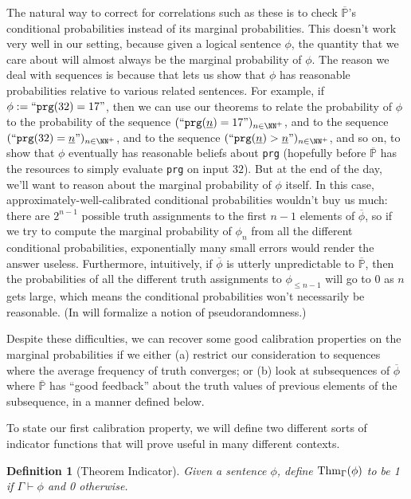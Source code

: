 \documentclass[authordate,onecolumn,noenvironments]{miri-tech-article}
\newtheorem{definition}[theorem]{Definition}
\numberwithin{equation}{subsection}
\newcommand{\quot}[1]{``#1"}
\newcommand{\enc}[1]{{\underline{#1}}}
\newcommand{\seq}[1]{{\overline{#1}}}
\newcommand{\nn}{n}
\newcommand{\phis}{\seq{\phi}}
\newcommand{\BelState}{\mathbb{P}}
\newcommand{\pt}{\BelState}
\newcommand{\MP}{\seq{\pt}}
\newcommand{\Theory}{\Gamma}
\newcommand{\thmind}[1][\Theory]{\operatorname{Thm}_{#1}\-} %
\begin{document}
The natural way to correct for correlations such as these is to check $\MP$'s conditional probabilities instead of its marginal probabilities. This doesn't work very well in our setting, because given a logical sentence $\phi$, the quantity that we care about will almost always be the marginal probability of $\phi$. The reason we deal with sequences is because that lets us show that $\phi$ has reasonable probabilities relative to various related sentences. For example, if $\phi := \quot{\texttt{prg}(32)=17}$, then we can use our theorems to relate the probability of $\phi$ to the probability of the sequence $(\quot{\texttt{prg}(\enc{\nn})=17})_{\nn \in \NN^+}$, and to the sequence $(\quot{\texttt{prg}(32)=\enc{\nn}})_{\nn \in \NN^+}$, and to the sequence $(\quot{\texttt{prg}(\enc{\nn})>\enc{\nn}})_{\nn \in \NN^+}$, and so on, to show that $\phi$ eventually has reasonable beliefs about \texttt{prg} (hopefully before $\MP$ has the resources to simply evaluate \texttt{prg} on input $32$). But at the end of the day, we'll want to reason about the marginal probability of $\phi$ itself. In this case, approximately-well-calibrated conditional probabilities wouldn't buy us much: there are $2^{n-1}$ possible truth assignments to the first $n-1$ elements of $\phis$, so if we try to compute the marginal probability of $\phi_\nn$ from all the different conditional probabilities, exponentially many small errors would render the answer useless. Furthermore, intuitively, if $\phis$ is utterly unpredictable to $\MP$, then the probabilities of all the different truth assignments to $\phi_{\le \nn-1}$ will go to 0 as $\nn$ gets large, which means the conditional probabilities won't necessarily be reasonable. (In  will formalize a notion of pseudorandomness.)

Despite these difficulties, we can recover some good calibration properties on the marginal probabilities if we either (a) restrict our consideration to sequences where the average frequency of truth converges; or (b) look at subsequences of $\phis$ where $\MP$ has ``good feedback'' about the truth values of previous elements of the subsequence, in a manner defined below.

To state our first calibration property, we will define two different sorts of indicator functions that will prove useful in many different contexts.

\begin{definition}[Theorem Indicator]\label{def:thmind}
  Given a sentence $\phi$, define $\thmind(\phi)$ to be 1 if $\Theory \vdash \phi$ and 0 otherwise.
\end{definition}
\end{document}
